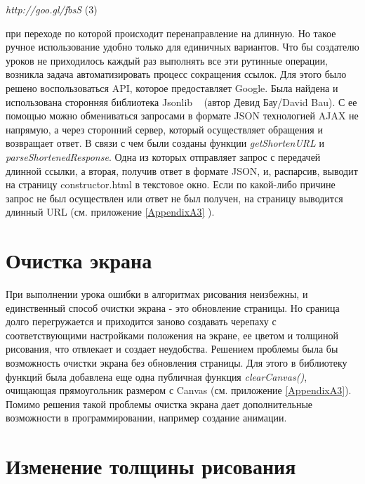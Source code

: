 \begin{center}
\vspace{6mm}
 \textit{ http://goo.gl/fbsS } (3)\par
\end{center}

при переходе по которой происходит перенаправление на длинную. Но такое ручное использование удобно только для единичных вариантов. Что бы создателю уроков не приходилось каждый раз выполнять все эти рутинные операции, возникла задача автоматизировать процесс сокращения ссылок. Для этого было решено воспользоваться API, которое предоставляет Google. Была найдена и использована сторонняя библиотека Jsonlib ~\cite{jsonlib} (автор Девид Бау/David Bau). С ее помощью можно обмениваться запросами в формате JSON технологией AJAX не напрямую, а через сторонний сервер, который осуществляет обращения и возвращает ответ. В связи с чем были созданы функции \textit{getShortenURL} и \textit{parseShortenedResponse}. Одна из которых отправляет запрос с передачей длинной ссылки, а вторая, получив ответ в формате JSON, и, распарсив, выводит на страницу constructor.html в текстовое окно. Если по какой-либо причине запрос не был осуществлен или ответ не был получен, на страницу выводится  длинный URL (см. приложение \ref{AppendixA3} ).



\section{Очистка экрана} \label{sect1_1}

При выполнении урока ошибки в алгоритмах рисования неизбежны, и единственный способ очистки экрана - это обновление страницы. Но сраница долго перегружается и приходится заново создавать черепаху с соответствующими настройками положения на экране, ее цветом и толщиной рисования, что отвлекает и создает неудобства. Решением проблемы была бы возможность очистки экрана без обновления страницы. Для этого в библиотеку функций была добавлена еще одна публичная функция \textit{clearCanvas()}, очищающая прямоугольник размером с Canvas (см. приложение \ref{AppendixA3}). Помимо решения такой проблемы очистка экрана дает дополнительные возможности в программировании, например создание анимации.

\section{Изменение толщины рисования} \label{sect1_1}


